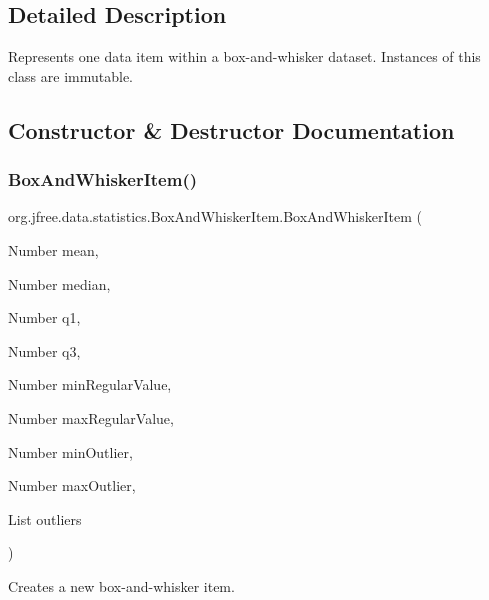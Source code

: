 \subsection{Detailed Description}
Represents one data item within a box-\/and-\/whisker dataset. Instances of this class are immutable. 

\subsection{Constructor \& Destructor Documentation}
\mbox{\label{classorg_1_1jfree_1_1data_1_1statistics_1_1_box_and_whisker_item_afa69e1dad3c898bfb78684839cec62ff}} 
\subsubsection{\texorpdfstring{Box\+And\+Whisker\+Item()}{BoxAndWhiskerItem()}\hspace{0.1cm}{\footnotesize\ttfamily [1/2]}}
{\footnotesize\ttfamily org.\+jfree.\+data.\+statistics.\+Box\+And\+Whisker\+Item.\+Box\+And\+Whisker\+Item (\begin{DoxyParamCaption}\item[{Number}]{mean,  }\item[{Number}]{median,  }\item[{Number}]{q1,  }\item[{Number}]{q3,  }\item[{Number}]{min\+Regular\+Value,  }\item[{Number}]{max\+Regular\+Value,  }\item[{Number}]{min\+Outlier,  }\item[{Number}]{max\+Outlier,  }\item[{List}]{outliers }\end{DoxyParamCaption})}

Creates a new box-\/and-\/whisker item.


